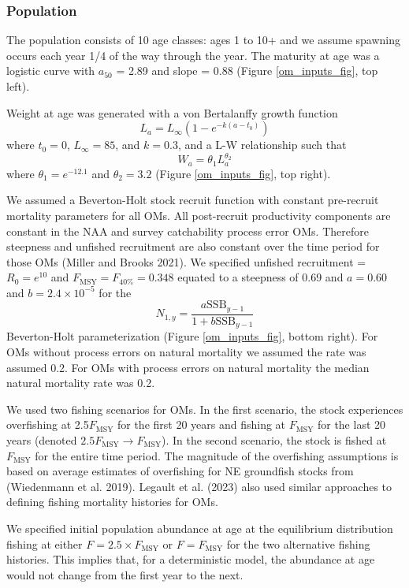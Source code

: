 \documentclass[
  12pt,
]{article}
\newcommand{\Fmsy}{\ensuremath{F_{\text{MSY}}}\xspace}
\begin{document}
\hypertarget{population}{%
\subsubsection*{Population}\label{population}}

The population consists of 10 age classes: ages 1 to 10+ and we assume
spawning occurs each year 1/4 of the way through the year. The maturity
at age was a logistic curve with \(a_{50}\) = 2.89 and slope = 0.88
(Figure \ref{om_inputs_fig}, top left).

Weight at age was generated with a von Bertalanffy growth function \[
L_a = L_{\infty}\left(1 - e^{-k(a - t_0)}\right)
\] where \(t_0 = 0\), \(L_\infty = 85\), and \(k = 0.3\), and a L-W
relationship such that \[
W_a = \theta_1 L_a^{\theta_2}
\] where \(\theta_1 = e^{-12.1}\) and \(\theta_2 = 3.2\) (Figure
\ref{om_inputs_fig}, top right).

We assumed a Beverton-Holt stock recruit function with constant
pre-recruit mortality parameters for all OMs. All post-recruit
productivity components are constant in the NAA and survey catchability
process error OMs. Therefore steepness and unfished recruitment are also
constant over the time period for those OMs (Miller and Brooks 2021). We
specified unfished recruitment = \(R_0 = e^{10}\) and
\(\Fmsy = F_{40\%} = 0.348\) equated to a steepness of 0.69 and
\(a=0.60\) and \(b = 2.4 \times 10^{-5}\) for the \[
N_{1,y} = \frac{a \text{SSB}_{y-1}}{1 + b \text{SSB}_{y-1}} 
\] Beverton-Holt parameterization (Figure \ref{om_inputs_fig}, bottom
right). For OMs without process errors on natural mortality we assumed
the rate was assumed 0.2. For OMs with process errors on natural
mortality the median natural mortality rate was 0.2.

We used two fishing scenarios for OMs. In the first scenario, the stock
experiences overfishing at 2.5\Fmsy for the first 20 years and fishing
at \Fmsy for the last 20 years (denoted \(2.5\Fmsy \rightarrow \Fmsy\)).
In the second scenario, the stock is fished at \Fmsy for the entire time
period. The magnitude of the overfishing assumptions is based on average
estimates of overfishing for NE groundfish stocks from (Wiedenmann et
al. 2019). Legault et al. (2023) also used similar approaches to
defining fishing mortality histories for OMs.

We specified initial population abundance at age at the equilibrium
distribution fishing at either \(F = 2.5\times \Fmsy\) or \(F = \Fmsy\)
for the two alternative fishing histories. This implies that, for a
deterministic model, the abundance at age would not change from the
first year to the next.
\end{document}
